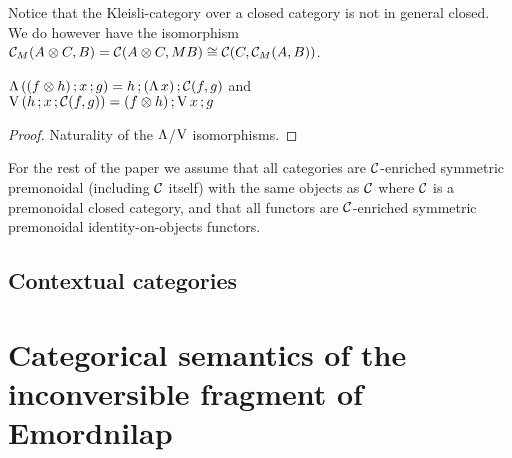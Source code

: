 \documentclass[runningheads,envcountsame]{llncs}
\newcommand{\monad}{M}
\newcommand{\homCM}[3][]{\homJ{#2}{\C_\monad}{#3}}
\begin{document}
Notice that the Kleisli-category over a closed category is not in general closed. We do however have the isomorphism $\C_M(\tensor{A}{C}, B) = \C(\tensor{A}{C}, \monad B) \cong \C(C, \homCM{A}{B})$.


\begin{lemma}
    $\curry\,(\comp{(\tensor{f}{h})}{\comp{x}{g}}) = \comp{h}{\comp{(\curry\,x)}{\homC{f}{g}}}$ and \\
    $\uncurry\,(\comp{h}{\comp{x}{\homC{f}{g}}}) = \comp{(\tensor{f}{h})}{\comp{\uncurry\,x}{g}}$
\end{lemma}
\begin{proof}
    Naturality of the $\curry$/$\uncurry$ isomorphisms.
\end{proof}

For the rest of the paper we assume that all categories are $\mathcal{C}$-enriched symmetric premonoidal (including $\mathcal{C}$ itself) with the same objects as $\mathcal{C}$ where $\mathcal{C}$ is a premonoidal closed category, and that all functors are $\mathcal{C}$-enriched symmetric premonoidal identity-on-objects functors.

\subsection{Contextual categories}

\section{Categorical semantics of the inconversible fragment of Emordnilap}
\end{document}
